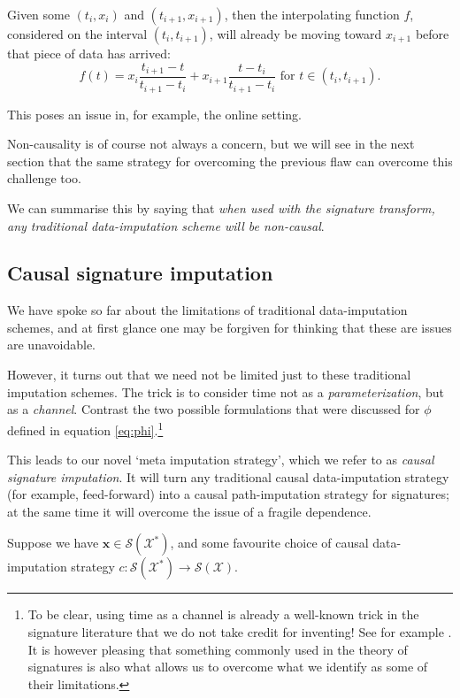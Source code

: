 \documentclass{article}
\newcommand{\dataspace}{\mathcal{X}}
\newcommand{\seriesspace}{\mathcal{S}}
\begin{document}
Given some $(t_i, x_i)$ and $(t_{i+1}, x_{i + 1})$, then the interpolating function $f$, considered on the interval $(t_i, t_{i + 1})$, will already be moving toward $x_{i + 1}$ before that piece of data has arrived:
\begin{equation*}
    f(t) = x_{i} \frac{t_{i + 1} - t}{t_{i + 1} - t_i} + x_{i + 1} \frac{t - t_i}{t_{i + 1} - t_i}\text{ for }t \in (t_i, t_{i + 1}).
\end{equation*}

This poses an issue in, for example, the online setting.

Non-causality is of course not always a concern, but we will see in the next section that the same strategy for overcoming the previous flaw can overcome this challenge too.

We can summarise this by saying that \emph{when used with the signature transform, any traditional data-imputation scheme will be non-causal}.

\subsection{Causal signature imputation}
We have spoke so far about the limitations of traditional data-imputation schemes, and at first glance one may be forgiven for thinking that these are issues are unavoidable. 

However, it turns out that we need not be limited just to these traditional imputation schemes. The trick is to consider time not as a \emph{parameterization}, but as a \emph{channel}. Contrast the two possible formulations that were discussed for $\phi$ defined in equation \eqref{eq:phi}.\footnote{To be clear, using time as a channel is already a well-known trick in the signature literature that we do not take credit for inventing! See for example \cite[Definition A.3]{kidger2019deep}. It is however pleasing that something commonly used in the theory of signatures is also what allows us to overcome what we identify as some of their limitations.}

This leads to our novel `meta imputation strategy', which we refer to as \emph{causal signature imputation}. It will turn any traditional causal data-imputation strategy (for example, feed-forward) into a causal path-imputation strategy for signatures; at the same time it will overcome the issue of a fragile dependence.

Suppose we have $\mathbf{x} \in \seriesspace(\dataspace^*)$, and some favourite choice of causal data-imputation strategy $c \colon \seriesspace(\dataspace^*) \to \seriesspace(\dataspace)$.
\end{document}
